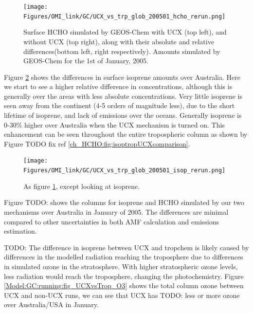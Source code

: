       \begin{figure}%
        \texttt{[image: Figures/OMI\_link/GC/UCX\_vs\_trp\_glob\_200501\_hcho\_rerun.png]}
        \caption{ %
          Surface HCHO simulated by GEOS-Chem with UCX (top left), and without UCX (top right), along with their absolute and relative differences(bottom left, right respectively).
          Amounts simulated by GEOS-Chem for the 1st of January, 2005.
        }
        \label{Model:GC:running:fig_UCXvsTrop_HCHO}
      \end{figure}
      
      Figure \ref{Model:GC:running:fig_UCXvsTrop_Isop} shows the differences in surface isoprene amounts over Australia.
      Here we start to see a higher relative difference in concentrations, although this is generally over the areas with less absolute concentrations. 
      Very little isoprene is seen away from the continent (4-5 orders of magnitude less), due to the short lifetime of isoprene, and lack of emissions over the oceans.
      Generally isoprene is 0-30\% higher over Australia when the UCX mechanism is turned on.
      This enhancement can be seen throughout the entire tropospheric column as shown by Figure TODO fix ref \ref{ch_HCHO:fig:isoptropUCXcomparison}. %
      \begin{figure}%
        \texttt{[image: Figures/OMI\_link/GC/UCX\_vs\_trp\_glob\_200501\_isop\_rerun.png]}
        \caption{ %
          As figure \ref{Model:GC:running:fig_UCXvsTrop_HCHO}, except looking at isoprene. 
        }      
        \label{Model:GC:running:fig_UCXvsTrop_Isop}
      \end{figure}
      
      
      Figure TODO: shows the columns for isoprene and HCHO simulated by our two mechanisms over Australia in January of 2005.
      The differences are minimal compared to other uncertainties in both AMF calculation and emissions estimation.
      
      
      TODO: The difference in isoprene between UCX and tropchem is likely caused by differences in the modelled radiation reaching the troposphere due to differences in simulated ozone in the stratosphere.
      With higher stratospheric ozone levels, less radiation would reach the troposphere, changing the photochemistry.
      Figure \ref{Model:GC:running:fig_UCXvsTrop_O3} shows the total column ozone between UCX and non-UCX runs, we can see that UCX has TODO: less or more ozone over Australia/USA in January.
      

